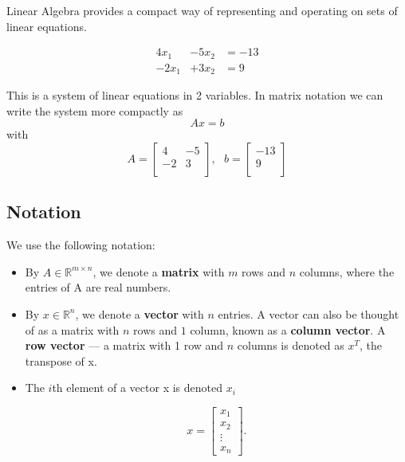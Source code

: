 Linear Algebra provides a compact way of representing and operating on sets of linear equations.

\begin{eqnarray*}
4x_{1} &- 5x_{2} &= -13 \\
-2x_{1} &+ 3x_{2} &= 9
\end{eqnarray*}

This is a system of linear equations in 2 variables. In matrix notation we can write the system more compactly as 
\begin{equation*}
Ax=b
\end{equation*}
with
\begin{equation*}
A= \left[ \begin{array}{cc}
4 & -5 \\
-2 & 3 \\
\end{array} \right], \text{	} b= \left[ \begin{array}{c}
-13 \\
9 \\
\end{array}\right]
\end{equation*}

\subsection{Notation}

We use the following notation:

\begin{itemize}

\item By $A \in \mathbb{R}^{m \times n}$, we denote a {\bf matrix} with $m$ rows and $n$ columns, where the 
entries of A are real numbers.

\item By $x \in \mathbb{R}^{n}$, we denote a {\bf vector} with $n$ entries. A vector can also be thought of as a matrix with $n$ rows and $1$ column, known as a {\bf column vector}. A {\bf row vector} --- a matrix with 1 row and $n$ columns is denoted as $x^{T}$, the transpose of x.

\item The $i$th element of a vector x is denoted $x_{i}$

\begin{equation*}
x = \left[\begin{array}{c}
x_{1} \\
x_{2} \\
\vdots \\
x_{n}
\end{array}\right].
\end{equation*}
\end{itemize}

